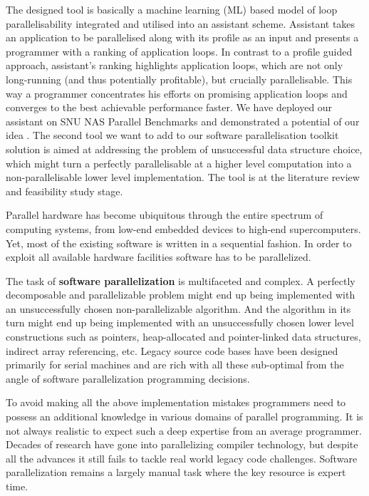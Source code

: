 \quad The designed tool is basically a machine learning (ML) based model of loop parallelisability integrated and utilised into an assistant scheme. Assistant takes an application to be parallelised along with its profile as an input and presents a programmer with a ranking of application loops. In contrast to a profile guided approach, assistant's ranking highlights application loops, which are not only long-running (and thus potentially profitable), but crucially parallelisable. This way a programmer concentrates his efforts on promising application loops and converges to the best achievable performance faster. We have deployed our assistant on SNU NAS Parallel Benchmarks \cite{snu-npb-benchmarks} \cite{nasa-parallel-benchmarks} and demonstrated a potential of our idea \cite{aiseps}.\newline\null
\quad The second tool we want to add to our software parallelisation toolkit solution is aimed at addressing the problem of unsuccessful data structure choice, which might turn a perfectly parallelisable at a higher level computation into a non-parallelisable lower level implementation. The tool is at the literature review and feasibility study stage.





\quad Parallel hardware has become ubiquitous through the entire spectrum of computing systems, from low-end embedded devices to high-end supercomputers. Yet, most of the existing software is written in a sequential fashion. In order to exploit all available hardware facilities software has to be parallelized.


\quad The task of \textbf{software parallelization} is multifaceted and complex. A perfectly decomposable and parallelizable problem might end up being implemented with an unsuccessfully chosen non-parallelizable algorithm. And the algorithm in its turn might end up being implemented with an unsuccessfully chosen lower level constructions such as pointers, heap-allocated and pointer-linked data structures, indirect array referencing, etc. Legacy source code bases have been designed primarily for serial machines and are rich with all these sub-optimal from the angle of software parallelization programming decisions.


\quad To avoid making all the above implementation mistakes programmers need to possess an additional knowledge in various domains of parallel programming. It is not always realistic to expect such a deep expertise from an average programmer. Decades of research have gone into parallelizing compiler technology, but despite all the advances it still fails to tackle real world legacy code challenges. Software parallelization remains a largely manual task where the key resource is expert time.


